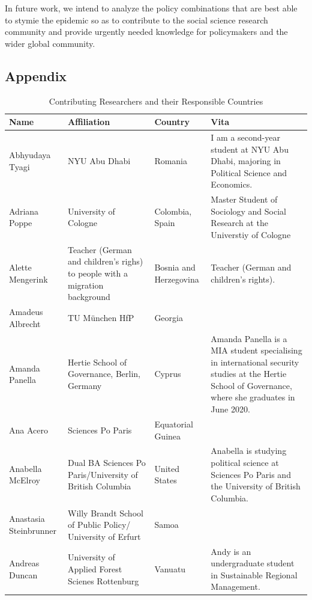 \documentclass[]{article}
\begin{document}
In future work, we intend to analyze the policy combinations that are best able to stymie the epidemic so as to contribute to the social science research community and provide urgently needed knowledge for policymakers and the wider global community.

\hypertarget{appendix}{%
\subsection*{Appendix}\label{appendix}}

\begin{longtable}{l>{\raggedright\arraybackslash}p{2cm}>{\raggedright\arraybackslash}p{2cm}>{\raggedright\arraybackslash}p{3cm}}
\caption{\label{tab:ratable}Contributing Researchers and their Responsible Countries}\\
\toprule
Name & Affiliation & Country & Vita\\
\midrule
\rowcolor{gray!6}  Abhyudaya Tyagi & NYU Abu Dhabi & Romania & I am a second-year student at NYU Abu Dhabi, majoring in Political Science and Economics.\\
Adriana Poppe & University of Cologne & Colombia, Spain & Master Student of Sociology and Social Research at the Universtiy of Cologne\\
\rowcolor{gray!6}  Alette Mengerink & Teacher (German and children's righs) to people with a migration background & Bosnia and Herzegovina & Teacher (German and children’s rights).\\
Amadeus Albrecht & TU München HfP & Georgia & \\
\rowcolor{gray!6}  Amanda Panella & Hertie School of Governance, Berlin, Germany & Cyprus & Amanda Panella is a MIA student specialising in international security studies at the Hertie School of Governance, where she graduates in June 2020.\\
\addlinespace
Ana Acero & Sciences Po Paris & Equatorial Guinea & \\
\rowcolor{gray!6}  Anabella McElroy & Dual BA Sciences Po Paris/University of British Columbia & United States & Anabella is studying political science at Sciences Po Paris and the University of British Columbia.\\
Anastasia Steinbrunner & Willy Brandt School of Public Policy/ University of Erfurt & Samoa & \\
\rowcolor{gray!6}  Andreas Duncan & University of Applied Forest Scienes Rottenburg & Vanuatu & Andy is an undergraduate student in Sustainable Regional Management.\\

\end{longtable}
\end{document}
